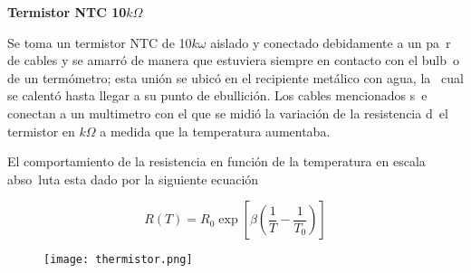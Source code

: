 \documentclass{article}
\begin{document}
\textbf{Termistor NTC 10$k\Omega$}

Se toma un termistor NTC de 10$k\omega$ aislado y conectado debidamente a un pa\
r de cables y se amarró de manera que estuviera siempre en contacto con el bulb\
o de un termómetro; esta unión se ubicó en el recipiente metálico con agua, la \
cual se calentó hasta llegar a su punto de ebullición. Los cables mencionados s\
e conectan a un multimetro con el que se midió la variación de la resistencia d\
el termistor en $k\Omega$ a medida que la temperatura aumentaba.

El comportamiento de la resistencia en función de la temperatura en escala abso\
luta esta dado por la siguiente ecuación

\[R(T)=R_0 \exp{\left[\beta\left(\frac{1}{T}-\frac{1}{T_0}\right)\right]}\]
\begin{figure}
\begin{center}
\texttt{[image: thermistor.png]}
\end{center}
\end{figure}
\end{document}
